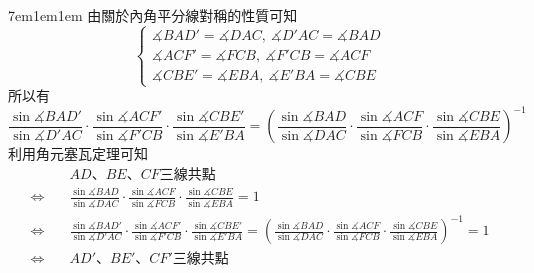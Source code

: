 \documentclass[12pt]{article}
\begin{document}
\begin{mybox}[Answer 9]{7em}{1em}{1em}
    由關於內角平分線對稱的性質可知
    $$
        \begin{cases}
            \measuredangle{BAD'}=\measuredangle{DAC},\ \measuredangle{D'AC}=\measuredangle{BAD}\\
            \measuredangle{ACF'}=\measuredangle{FCB},\ \measuredangle{F'CB}=\measuredangle{ACF}\\
            \measuredangle{CBE'}=\measuredangle{EBA},\ \measuredangle{E'BA}=\measuredangle{CBE}           
        \end{cases}
    $$
    所以有
    $$
        \frac{\sin{\measuredangle{BAD'}}}{\sin{\measuredangle{D'AC}}}
        \cdot\frac{\sin{\measuredangle{ACF'}}}{\sin{\measuredangle{F'CB}}}
        \cdot\frac{\sin{\measuredangle{CBE'}}}{\sin{\measuredangle{E'BA}}} = \left(\frac{\sin{\measuredangle{BAD}}}{\sin{\measuredangle{DAC}}}
        \cdot\frac{\sin{\measuredangle{ACF}}}{\sin{\measuredangle{FCB}}}
        \cdot\frac{\sin{\measuredangle{CBE}}}{\sin{\measuredangle{EBA}}}\right)^{-1}
    $$
    利用角元塞瓦定理可知
    \begin{align*}
        &\text{$AD$、$BE$、$CF$三線共點}\\
        \Leftrightarrow\quad&\frac{\sin{\measuredangle{BAD}}}{\sin{\measuredangle{DAC}}}
        \cdot\frac{\sin{\measuredangle{ACF}}}{\sin{\measuredangle{FCB}}}
        \cdot\frac{\sin{\measuredangle{CBE}}}{\sin{\measuredangle{EBA}}}=1\\
        \Leftrightarrow\quad&\frac{\sin{\measuredangle{BAD'}}}{\sin{\measuredangle{D'AC}}}
        \cdot\frac{\sin{\measuredangle{ACF'}}}{\sin{\measuredangle{F'CB}}}
        \cdot\frac{\sin{\measuredangle{CBE'}}}{\sin{\measuredangle{E'BA}}} = \left(\frac{\sin{\measuredangle{BAD}}}{\sin{\measuredangle{DAC}}}
        \cdot\frac{\sin{\measuredangle{ACF}}}{\sin{\measuredangle{FCB}}}
        \cdot\frac{\sin{\measuredangle{CBE}}}{\sin{\measuredangle{EBA}}}\right)^{-1}=1\\
        \Leftrightarrow\quad&\text{$AD'$、$BE'$、$CF'$三線共點}
        \end{align*}
\end{mybox}
\end{document}
